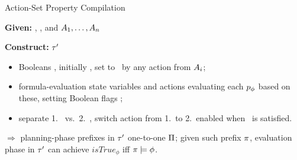 \begin{frame}{Action-Set Property Compilation}

\textbf{Given:} \task, \plans, and $A_1, \dots, A_n$

\bigskip

\textbf{Construct:} $\tau'$

\begin{itemize}
\item Booleans , initially
  \false, set to \true\ by any action from $A_i$;
\item formula-evaluation state variables and actions
  evaluating each $p_\phi$ based on these, setting Boolean flags
  ;
\item separate 1.\ 
  vs.\ 2.\ , switch action from 1.\ to
  2.\ enabled when \goalhard\ is satisfied.
\end{itemize}

\pause

$\Rightarrow$ planning-phase prefixes in $\tau'$ one-to-one $\Pi$;
given such prefix $\pi$, evaluation phase in $\tau'$ can achieve
$\mathit{isTrue}_\phi$ iff $\pi \models \phi$.

\end{frame}


